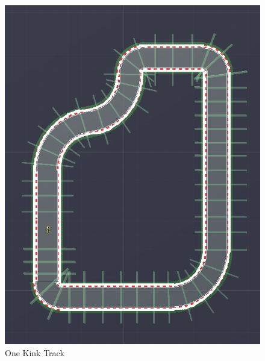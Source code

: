 \begin{figure}[H]
  \centering
  \begin{minipage}[b]{0.45\textwidth}
    \includegraphics[width=\textwidth]{images/tracks/ComplicatedTrack.PNG}
    \caption{One Kink Track}
    \label{fig:onekink}
  \end{minipage}
  \hfill
  \begin{minipage}[b]{0.45\textwidth}

\end{minipage}
\end{figure}
